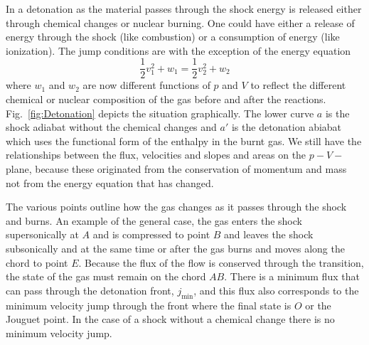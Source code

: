 In a detonation as the material passes through the shock energy is
released either through chemical changes or nuclear burning.  One
could have either a release of energy through the shock (like
combustion) or a consumption of energy (like ionization).   The jump
conditions are with the exception of the energy equation
\begin{equation}
\frac{1}{2} v_1^2 + w_1 = \frac{1}{2} v_2^2 + w_2
\label{eq:853}
\end{equation}
where $w_1$ and $w_2$ are now different functions of $p$ and $V$ to
reflect the different chemical or nuclear composition of the gas
before and after the reactions.  Fig.~\ref{fig:Detonation} depicts the
situation graphically.  The lower curve $a$ is the shock adiabat
without the chemical changes and $a'$ is the detonation abiabat which
uses the functional form of the enthalpy in the burnt gas.  We still
have the relationships between the flux, velocities and slopes and
areas on the $p-V-$plane, because these originated from the
conservation of momentum and mass not from the energy equation that
has changed.

The various points outline how the gas changes as it passes through
the shock and burns.  An example of the general case, the gas enters
the shock supersonically at $A$ and is compressed to point $B$ and
leaves the shock subsonically and at the same time or after the gas
burns and moves along the chord to point $E$.  Because the flux of the
flow is conserved through the transition, the state of the gas must
remain on the chord $AB$.  There is a minimum flux that can pass
through the detonation front, $j_\mathrm{min}$, and this flux also
corresponds to the minimum velocity jump through the front where the
final state is $O$ or the Jouguet point.  In the
case of a shock without a chemical change there is no minimum velocity
jump.  


